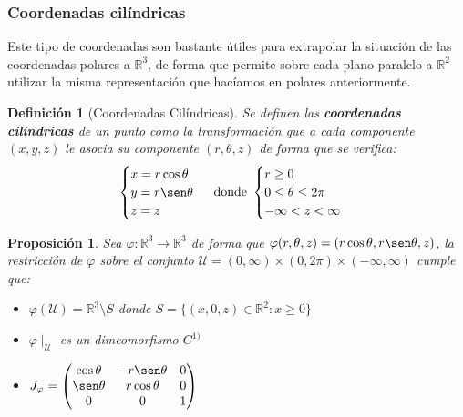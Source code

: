 \documentclass[10pt,a4paper,openright]{book}
\theoremstyle{break}
\newtheorem*{defi}{Definición}
\newtheorem*{prop}{Proposición}
\begin{document}
\subsubsection*{Coordenadas cilíndricas}
Este tipo de coordenadas son bastante útiles para extrapolar la situación de las coordenadas polares a $\mathbb{R}^3$, de forma que permite sobre cada plano paralelo a $\mathbb{R}^2$ utilizar la misma representación que hacíamos en polares anteriormente.

\begin{defi}[Coordenadas Cilíndricas]
Se definen las \textbf{coordenadas cilíndricas} de un punto como la transformación que a cada componente $(x,y,z)$ le asocia su componente $(r, \theta, z)$ de forma que se verifica:
$$\begin{cases} x = r \cos \theta \\ y = r \sen \theta \\ z = z\end{cases} \mbox{ donde } \begin{cases} r \ge 0\\ 0 \le \theta \le 2\pi \\ -\infty < z < \infty \end{cases}$$
\end{defi}

\begin{prop}
Sea $\varphi: \mathbb{R}^3\rightarrow  \mathbb{R}^3$ de forma que $\varphi(r, \theta, z) = (r\cos\theta, r\sen\theta, z)$, la restricción de $\varphi$ sobre el conjunto $\mathcal{U} = (0,\infty)\times (0, 2\pi) \times (-\infty, \infty)$ cumple que:
\begin{itemize}
\item $\varphi(\mathcal{U}) = \mathbb{R}^3\setminus{S}$ donde $S = \{(x,0,z)\in \mathbb{R}^2: x\geq 0\}$
\item $\varphi\mid_\mathcal{U}$ es un dimeomorfismo-$C^{1)}$
\item $J_\varphi = \begin{pmatrix}\cos \theta & -r\sen \theta & 0 \\ \sen \theta & r\cos \theta & 0 \\ 0 & 0 & 1\end{pmatrix}$
\end{itemize}
\end{prop}
\end{document}
